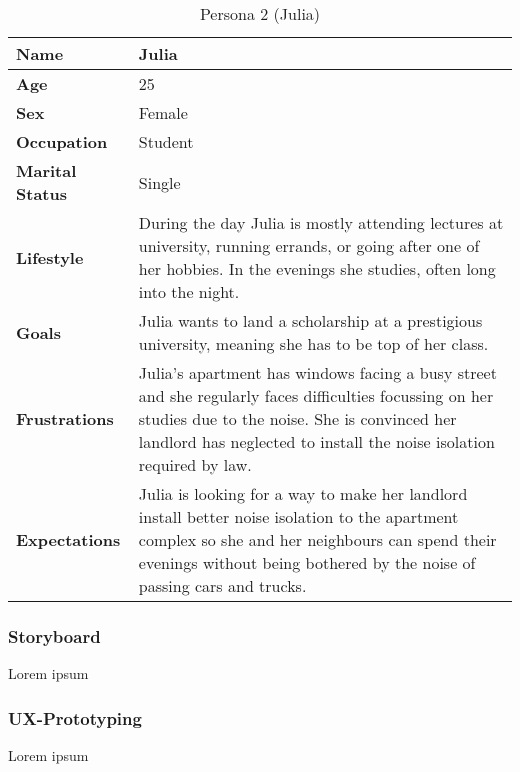 \begin{table}
    \centering
    \begin{tabularx}{\textwidth}{|l|X|}
        \hline
        \textbf{Name} & Julia \\
        \hline
        \textbf{Age} & 25 \\
        \hline
        \textbf{Sex} & Female \\
        \hline
        \textbf{Occupation} & Student \\
        \hline
        \textbf{Marital Status} & Single \\
        \hline
        \textbf{Lifestyle} & During the day Julia is mostly attending lectures at university, running errands, or going after one of her hobbies.
        In the evenings she studies, often long into the night. \\
        \hline
        \textbf{Goals} & Julia wants to land a scholarship at a prestigious university, meaning she has to be top of her class. \\
        \hline
        \textbf{Frustrations} & Julia's apartment has windows facing a busy street and she regularly faces difficulties focussing on her studies
        due to the noise. She is convinced her landlord has neglected to install the noise isolation required by law. \\
        \hline
        \textbf{Expectations} & Julia is looking for a way to make her landlord install better noise isolation to the apartment complex so she and
        her neighbours can spend their evenings without being bothered by the noise of passing cars and trucks. \\
        \hline
    \end{tabularx}
    \caption{Persona 2 (Julia)}
    \label{table:persona2}
\end{table}

\subsubsection{Storyboard}
\label{subsubsec:storyboard}
Lorem ipsum

\subsubsection{UX-Prototyping}
\label{subsubsec:ux_prototyping}
Lorem ipsum